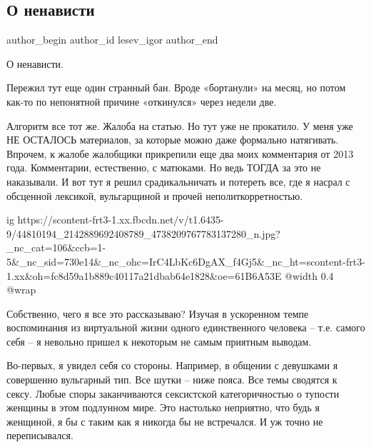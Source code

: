  
 
 
 
 
 
\subsection{О ненависти}
\label{sec:26_10_2018.fb.lesev_igor.1.o_nenavisti}
 
\ifcmt
 author_begin
   author_id lesev_igor
 author_end
\fi

О ненависти.

Пережил тут еще один странный бан. Вроде «бортанули» на месяц, но потом как-то
по непонятной причине «откинулся» через недели две.

Алгоритм все тот же. Жалоба на статью. Но тут уже не прокатило. У меня уже НЕ
ОСТАЛОСЬ материалов, за которые можно даже формально натягивать. Впрочем, к
жалобе жалобщики прикрепили еще два моих комментария от 2013 года. Комментарии,
естественно, с матюками. Но ведь ТОГДА за это не наказывали. И вот тут я решил
срадикальничать и потереть все, где я насрал с обсценной лексикой, вульгарщиной
и прочей неполиткорретностью.

\ifcmt
  ig https://scontent-frt3-1.xx.fbcdn.net/v/t1.6435-9/44810194_2142889692408789_4738209767783137280_n.jpg?_nc_cat=106&ccb=1-5&_nc_sid=730e14&_nc_ohc=IrC4LbKc6DgAX_f4Gj5&_nc_ht=scontent-frt3-1.xx&oh=fc8d59a1b889c40117a21dbab64e1828&oe=61B6A53E
  @width 0.4
  @wrap 
\fi

Собственно, чего я все это рассказываю? Изучая в ускоренном темпе воспоминания
из виртуальной жизни одного единственного человека – т.е. самого себя – я
невольно пришел к некоторым не самым приятным выводам.

Во-первых, я увидел себя со стороны. Например, в общении с девушками я
совершенно вульгарный тип. Все шутки – ниже пояса. Все темы сводятся к сексу.
Любые споры заканчиваются сексистской категоричностью о тупости женщины в этом
подлунном мире. Это настолько неприятно, что будь я женщиной, я бы с таким как
я никогда бы не встречался. И уж точно не переписывался.

